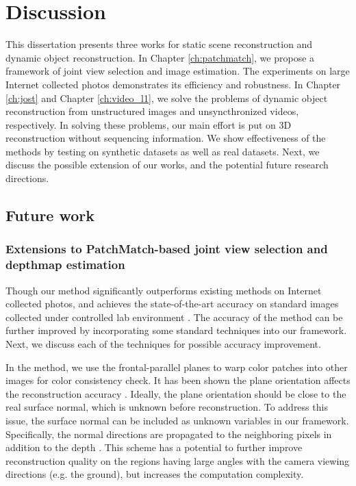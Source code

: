 \chapter{Discussion}
\label{ch:discussion}
This dissertation presents three works for static scene reconstruction and dynamic object reconstruction. In Chapter \ref{ch:patchmatch}, we propose a framework of joint view selection and image estimation. The experiments on large Internet collected photos demonstrates its efficiency and robustness. In Chapter \ref{ch:jost} and Chapter \ref{ch:video_l1}, we solve the problems of dynamic object reconstruction from unstructured images and unsyncthronized videos, respectively. In solving these problems, our main effort is put on 3D reconstruction without sequencing information. We show effectiveness of the methods by testing on synthetic datasets as well as real datasets. Next, we discuss the possible extension of our works, and the potential future research directions.


\section{Future work}


\subsection{Extensions to PatchMatch-based joint view selection and depthmap estimation}
\label{sec:patchmatch_extensions}

Though our method significantly outperforms existing methods on Internet collected photos, and
achieves the state-of-the-art accuracy on standard images collected under controlled lab environment \cite{Strecha08}. The accuracy of the method can be further improved by incorporating some standard techniques into our framework. Next, we discuss each of the techniques for possible accuracy improvement.

In the method, we use the frontal-parallel planes to warp color patches into other images for color consistency check. It has been shown the plane orientation affects the reconstruction accuracy \cite{gallup07,FURUKAWA_PAMI2010}. 
Ideally, the plane orientation should be close to the real surface normal, which is unknown before reconstruction. To address this issue, the surface normal can be included as unknown variables in our framework. Specifically, the normal directions are propagated to the neighboring pixels in addition to the depth \cite{patchMatchStereo1}. This scheme has a potential to further improve reconstruction quality on the regions having large angles with the camera viewing directions (e.g. the ground), but increases the computation complexity.

